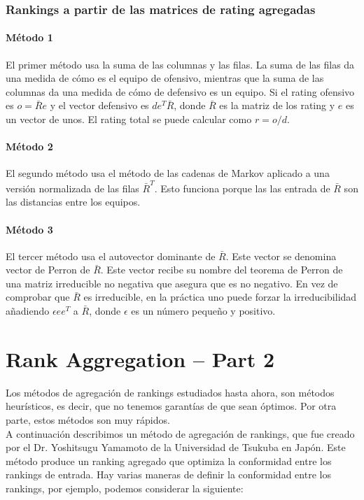  \subsubsection{Rankings a partir de las matrices de rating agregadas}
 
 \paragraph{Método 1} El primer método usa la suma de las columnas y las filas. La suma de las filas da una medida de cómo es el equipo de ofensivo, mientras que la suma de las columnas da una medida de cómo de defensivo es un equipo. Si el rating ofensivo es $o = \bar{R}e$ y el vector defensivo es $d e^{T} \bar{R}$, donde $\bar{R}$ es la matriz de los rating y $e$ es un vector de unos. El rating total se puede calcular como $r=o/d$. 
 
 \paragraph{Método 2} El segundo método usa el método de las cadenas de Markov aplicado a una versión normalizada de las filas $\bar{R}^{T}$. Esto funciona porque las las entrada de $\bar{R}$ son las distancias entre los equipos.
 
 \paragraph{Método 3} El tercer método usa el autovector dominante de $\bar{R}$. Este vector se denomina vector de Perron de $\bar{R}$. Este vector recibe su nombre del teorema de Perron de una matriz irreducible no negativa que asegura que es no negativo. En vez de comprobar que $\bar{R}$ es irreducible, en la práctica uno puede forzar la irreducibilidad añadiendo $\epsilon e e^T$ a $\bar{R}$, donde $\epsilon$ es un número pequeño y positivo.
 
 \section{Rank Aggregation -- Part 2} 
 
 Los métodos de agregación de rankings estudiados hasta ahora, son métodos heurísticos, es decir, que no tenemos garantías de que sean óptimos. Por otra parte, estos métodos son muy rápidos.\\
 
 A continuación describimos un método de agregación de rankings, que fue creado por el Dr. Yoshitsugu Yamamoto de la Universidad de Tsukuba en Japón. Este método produce un ranking agregado que optimiza la conformidad entre los rankings de entrada. Hay varias maneras de definir la conformidad entre los rankings, por ejemplo, podemos considerar la siguiente:
 
